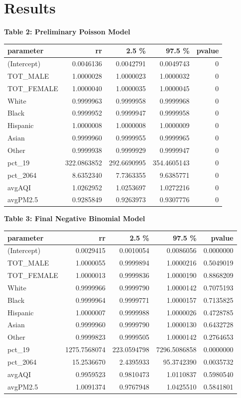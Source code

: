 \documentclass[
]{article}
\begin{document}
\hypertarget{results}{%
\section{Results}\label{results}}

\textbf{Table 2: Preliminary Poisson Model}

\begin{longtable}[]{@{}lrrrr@{}}
\toprule
parameter & rr & 2.5 \% & 97.5 \% & pvalue\tabularnewline
\midrule
\endhead
(Intercept) & 0.0046136 & 0.0042791 & 0.0049743 & 0\tabularnewline
TOT\_MALE & 1.0000028 & 1.0000023 & 1.0000032 & 0\tabularnewline
TOT\_FEMALE & 1.0000040 & 1.0000035 & 1.0000045 & 0\tabularnewline
White & 0.9999963 & 0.9999958 & 0.9999968 & 0\tabularnewline
Black & 0.9999952 & 0.9999947 & 0.9999958 & 0\tabularnewline
Hispanic & 1.0000008 & 1.0000008 & 1.0000009 & 0\tabularnewline
Asian & 0.9999960 & 0.9999955 & 0.9999965 & 0\tabularnewline
Other & 0.9999938 & 0.9999929 & 0.9999947 & 0\tabularnewline
pct\_19 & 322.0863852 & 292.6690995 & 354.4605143 & 0\tabularnewline
pct\_2064 & 8.6352340 & 7.7363355 & 9.6385771 & 0\tabularnewline
avgAQI & 1.0262952 & 1.0253697 & 1.0272216 & 0\tabularnewline
avgPM2.5 & 0.9285849 & 0.9263973 & 0.9307776 & 0\tabularnewline
\bottomrule
\end{longtable}

\textbf{Table 3: Final Negative Binomial Model}

\begin{longtable}[]{@{}lrrrr@{}}
\toprule
parameter & rr & 2.5 \% & 97.5 \% & pvalue\tabularnewline
\midrule
\endhead
(Intercept) & 0.0029415 & 0.0010054 & 0.0086056 &
0.0000000\tabularnewline
TOT\_MALE & 1.0000055 & 0.9999894 & 1.0000216 & 0.5049019\tabularnewline
TOT\_FEMALE & 1.0000013 & 0.9999836 & 1.0000190 &
0.8868209\tabularnewline
White & 0.9999966 & 0.9999790 & 1.0000142 & 0.7075193\tabularnewline
Black & 0.9999964 & 0.9999771 & 1.0000157 & 0.7135825\tabularnewline
Hispanic & 1.0000007 & 0.9999988 & 1.0000026 & 0.4728785\tabularnewline
Asian & 0.9999960 & 0.9999790 & 1.0000130 & 0.6432728\tabularnewline
Other & 0.9999823 & 0.9999505 & 1.0000142 & 0.2764653\tabularnewline
pct\_19 & 1275.7568074 & 223.0594798 & 7296.5086858 &
0.0000000\tabularnewline
pct\_2064 & 15.2536670 & 2.4395933 & 95.3742390 &
0.0035732\tabularnewline
avgAQI & 0.9959523 & 0.9810473 & 1.0110837 & 0.5980540\tabularnewline
avgPM2.5 & 1.0091374 & 0.9767948 & 1.0425510 & 0.5841801\tabularnewline
\bottomrule
\end{longtable}
\end{document}

